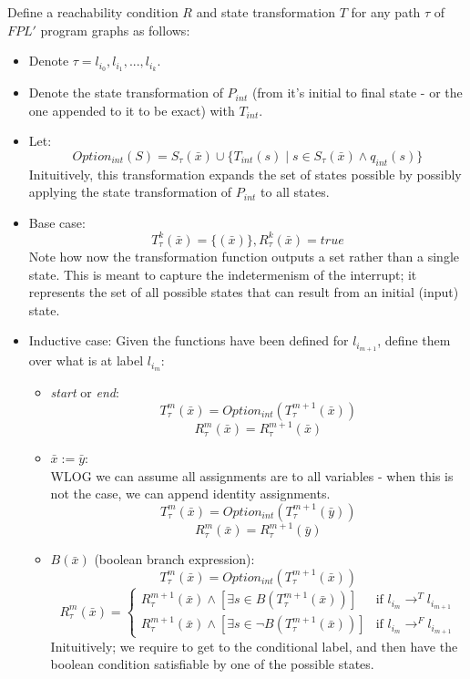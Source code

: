 \documentclass{article}
\begin{document}
Define a reachability condition $R$ and state transformation $T$ for any path $\tau$ of $FPL'$ program graphs as follows:
\begin{itemize}
    \item Denote $\tau = l_{i_0},l_{i_1},...,l_{i_k}$.
    \item Denote the state transformation of $P_{int}$ (from it's initial to final state - or the one appended to it to be exact) with $T_{int}$.
    \item Let:
    \[
        Option_{int}(S)=S_\tau(\bar{x})\cup
            \{T_{int}(s) \mid s\in S_\tau(\bar{x})\wedge q_{int}(s)\}
    \]
    Inituitively, this transformation expands the set of states possible
    by possibly applying the state transformation of $P_{int}$ to all states.
    \item Base case:
    \[
        T^k_\tau(\bar{x})=\{(\bar{x})\}, R^k_\tau(\bar{x})=true
    \]
    Note how now the transformation function outputs a set rather than a single state.
    This is meant to capture the indetermenism of the interrupt; it represents
    the set of all possible states that can result from an initial (input) state.
    \item Inductive case: Given the functions have been defined for $l_{i_{m+1}}$,
    define them over what is at label $l_{i_m}$:
    \begin{itemize}
        \item \emph{start} or \emph{end}:
        \[
            T^m_\tau(\bar{x})=Option_{int}(T^{m+1}_\tau(\bar{x}))
        \]\[
            R^m_\tau(\bar{x})=R^{m+1}_\tau(\bar{x})
        \]
        \item $\bar{x}:=\bar{y}$:\\
        WLOG we can assume all assignments are to all variables - when this is not the case, we can append identity assignments.
        \[
            T^m_\tau(\bar{x})=Option_{int}(T^{m+1}_\tau(\bar{y}))    
        \]
        \[
            R^m_\tau(\bar{x})=R^{m+1}_\tau(\bar{y})
        \]
        \item $B(\bar{x})$ (boolean branch expression):
        \[
            T^m_\tau(\bar{x})=Option_{int}(T^{m+1}_\tau(\bar{x}))
        \]\[
            R^m_\tau(\bar{x})=
            \begin{cases}
                R^{m+1}_\tau(\bar{x})\wedge[\exists s\in B(T^{m+1}_\tau(\bar{x}))] & \text{if } l_{i_m}\rightarrow^T l_{i_{m+1}}\\
                R^{m+1}_\tau(\bar{x})\wedge[\exists s\in \neg B(T^{m+1}_\tau(\bar{x}))] & \text{if } l_{i_m}\rightarrow^F l_{i_{m+1}}
            \end{cases}
        \]
        Inituitively; we require to get to the conditional label, and then have the
        boolean condition satisfiable by one of the possible states.

        
    \end{itemize}
\end{itemize}
\end{document}
